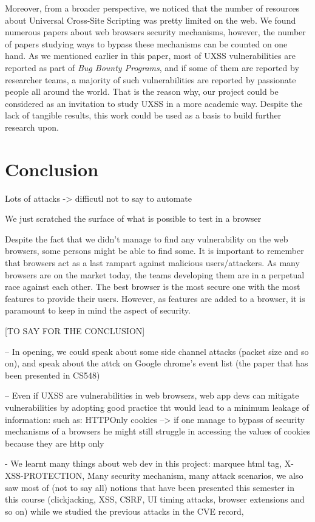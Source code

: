 \documentclass[journal]{IEEEtran}
\begin{document}
\medskip

Moreover, from a broader perspective, we noticed that the number of resources about Universal Cross-Site Scripting was pretty limited on the web. We found numerous papers about web browsers security mechanisms, however, the number of papers studying ways to bypass these mechanisms can be counted on one hand. As we mentioned earlier in this paper, most of UXSS vulnerabilities are reported as part of \emph{Bug Bounty Programs}, and if some of them are reported by researcher teams, a majority of such vulnerabilities are reported by passionate people all around the world. That is the reason why, our project could be considered as an invitation to study UXSS in a more academic way. Despite the lack of tangible results, this work could be used as a basis to build further research upon.


\section{Conclusion}
Lots of attacks -> difficutl not to say to automate 

We just scratched the surface of what is possible to test in a browser

Despite the fact that we didn't manage to find any vulnerability on the web browsers, some persons might be able to find some. It is important to remember that browsers act as a last rampart against malicious users/attackers. As many browsers are on the market today, the teams developing them are in a perpetual race against each other. The best browser is the most secure one with the most features to provide their users. However, as features are added to a browser, it is paramount to keep in mind the aspect of security.

[TO SAY FOR THE CONCLUSION]

-- In opening, we could speak about some side channel attacks (packet size and so on), and speak about the attck on Google chrome's event list (the paper that has been presented in CS548)

-- Even if UXSS are vulnerabilities in web browsers, web app devs can mitigate vulnerabilities by adopting good practice tht would lead to a minimum leakage of information: such as: HTTPOnly cookies --> if one manage to bypass of security mechanisms of a browsers he might still struggle in accessing the values of cookies because they are http only 

- We learnt many things about web dev in this project: marquee html tag, X-XSS-PROTECTION, Many security mechanism, many attack scenarios, we also saw most of (not to say all) notions that have been presented this semester in this course (clickjacking, XSS, CSRF, UI timing attacks, browser extensions and so on) while we studied the previous attacks in the CVE record,
\end{document}
